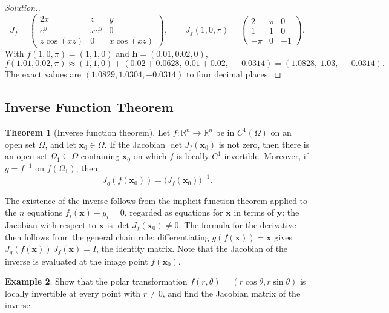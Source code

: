 \documentclass[11pt,a4paper]{article}
\theoremstyle{definition}
\newtheorem{thm}{Theorem}[subsection]
\newtheorem{exa}[thm]{Example}
\newenvironment{solution}
  {\renewcommand{\qedsymbol}{}\begin{proof}[\textit{Solution}.]}
  {\end{proof}}
\begin{document}
\begin{solution}
\[J_f = \begin{pmatrix} 2x & z & y\\ e^y & xe^y & 0\\ z\cos(xz) & 0 &
x\cos(xz)\end{pmatrix},\qquad J_f(1,0,\pi) = \begin{pmatrix} 2 & \pi & 0\\ 1 & 1
& 0\\ -\pi & 0 & -1\end{pmatrix} .\]
With $f(1,0,\pi) = (1, 1, 0)$ and $\mathbf h = (0.01, 0.02, 0)$,
\[f(1.01,0.02,\pi)\approx (1,1,0) + (0.02 + 0.0628,\ 0.01 + 0.02,\ -0.0314) =
(1.0828,\ 1.03,\ -0.0314).\]
The exact values are $(1.0829, 1.0304, -0.0314)$ to four decimal places.
\end{solution}

{\color[wave]{485}\subsection{Inverse Function Theorem}}

\begin{thm}[Inverse function theorem]
\label{thm:inverse}
Let $f: \mathbb{R}^n \to \mathbb{R}^n$ be in $C^1(\Omega)$ on an open set
$\Omega$, and let $\mathbf x_0\in\Omega$. If the Jacobian
$\det J_f(\mathbf x_0)$ is not zero, then there is an open set
$\Omega_1 \subseteq \Omega$ containing $\mathbf x_0$ on which $f$ is locally
$C^1$-invertible. Moreover, if $g = f^{-1}$ on $f(\Omega_1)$, then
\[J_g(f(\mathbf x_0)) = \big(J_f(\mathbf x_0)\big)^{-1} .\]
\end{thm}

The existence of the inverse follows from the implicit function theorem applied
to the $n$ equations $f_i(\mathbf x) - y_i = 0$, regarded as equations for
$\mathbf x$ in terms of $\mathbf y$: the Jacobian with respect to $\mathbf x$ is
$\det J_f(\mathbf x_0)\neq 0$. The formula for the derivative then follows from
the general chain rule: differentiating $g(f(\mathbf x)) = \mathbf x$ gives
$J_g(f(\mathbf x))\,J_f(\mathbf x) = I$, the identity matrix. Note that the
Jacobian of the inverse is evaluated at the image point $f(\mathbf x_0)$.

\begin{exa}
\label{ex:polarinverse}
Show that the polar transformation $f(r,\theta) = (r\cos\theta, r\sin\theta)$ is
locally invertible at every point with $r\neq 0$, and find the Jacobian matrix of
the inverse.
\end{exa}
\end{document}
